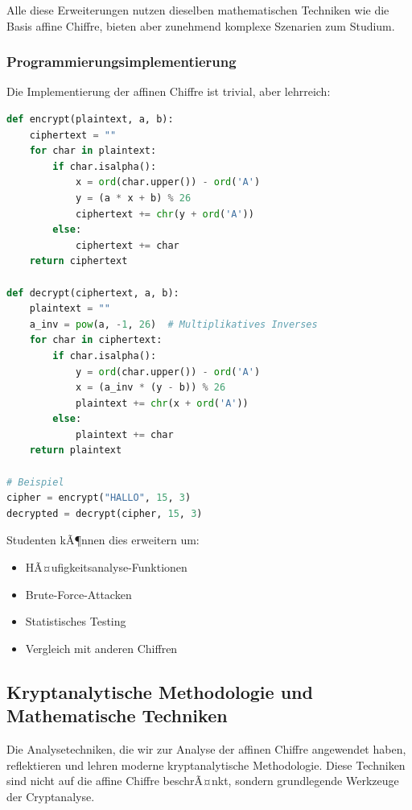 ﻿\documentclass[12pt,a4paper]{article}
\begin{document}
	Alle diese Erweiterungen nutzen dieselben mathematischen Techniken wie die Basis affine Chiffre, bieten aber zunehmend komplexe Szenarien zum Studium.
	
	\subsubsection{Programmierungsimplementierung}
	
	Die Implementierung der affinen Chiffre ist trivial, aber lehrreich:
	
	\begin{lstlisting}[language=Python, caption=Affine Cipher in Python]
def encrypt(plaintext, a, b):
    ciphertext = ""
    for char in plaintext:
        if char.isalpha():
            x = ord(char.upper()) - ord('A')
            y = (a * x + b) % 26
            ciphertext += chr(y + ord('A'))
        else:
            ciphertext += char
    return ciphertext

def decrypt(ciphertext, a, b):
    plaintext = ""
    a_inv = pow(a, -1, 26)  # Multiplikatives Inverses
    for char in ciphertext:
        if char.isalpha():
            y = ord(char.upper()) - ord('A')
            x = (a_inv * (y - b)) % 26
            plaintext += chr(x + ord('A'))
        else:
            plaintext += char
    return plaintext

# Beispiel
cipher = encrypt("HALLO", 15, 3)
decrypted = decrypt(cipher, 15, 3)
	\end{lstlisting}
	
	Studenten kÃ¶nnen dies erweitern um:
	\begin{itemize}
		\item HÃ¤ufigkeitsanalyse-Funktionen
		\item Brute-Force-Attacken
		\item Statistisches Testing
		\item Vergleich mit anderen Chiffren
	\end{itemize}
	
	
	\subsection{Kryptanalytische Methodologie und Mathematische Techniken}
	
	Die Analysetechniken, die wir zur Analyse der affinen Chiffre angewendet haben, reflektieren und lehren moderne kryptanalytische Methodologie. Diese Techniken sind nicht auf die affine Chiffre beschrÃ¤nkt, sondern grundlegende Werkzeuge der Cryptanalyse.
	
\end{document}

